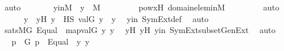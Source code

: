 \begin{isabellebody}
\ auto\isanewline
\ \ \ \ \isamarkupfalse%
\ \isamarkupfalse%
\ y{\isacharprime}{\kern0pt}inM\ {\isacharcolon}{\kern0pt}\ {\isachardoublequoteopen}y{\isacharprime}{\kern0pt}\ {\isasymin}\ M{\isachardoublequoteclose}\ \isanewline
\ \ \ \ \ \ \isamarkupfalse%
\ powx{\isacharprime}{\kern0pt}H\ domain{\isacharunderscore}{\kern0pt}elem{\isacharunderscore}{\kern0pt}in{\isacharunderscore}{\kern0pt}M\ \isanewline
\ \ \ \ \ \ \isamarkupfalse%
\ auto\isanewline
\isanewline
\ \ \ \ \isamarkupfalse%
\ y{\isacharprime}{\kern0pt}{\isacharprime}{\kern0pt}\ \ y{\isacharprime}{\kern0pt}{\isacharprime}{\kern0pt}H{\isacharcolon}{\kern0pt}\ {\isachardoublequoteopen}y{\isacharprime}{\kern0pt}{\isacharprime}{\kern0pt}\ {\isasymin}\ HS{\isachardoublequoteclose}\ {\isachardoublequoteopen}val{\isacharparenleft}{\kern0pt}G{\isacharcomma}{\kern0pt}\ y{\isacharprime}{\kern0pt}{\isacharprime}{\kern0pt}{\isacharparenright}{\kern0pt}\ {\isacharequal}{\kern0pt}\ y{\isachardoublequoteclose}\ \isamarkupfalse%
\ yin\ SymExt{\isacharunderscore}{\kern0pt}def\ \isamarkupfalse%
\ auto\isanewline
\isanewline
\ \ \ \ \isamarkupfalse%
\ {\isachardoublequoteopen}sats{\isacharparenleft}{\kern0pt}M{\isacharbrackleft}{\kern0pt}G{\isacharbrackright}{\kern0pt}{\isacharcomma}{\kern0pt}\ Equal{\isacharparenleft}{\kern0pt}{}{\isacharcomma}{\kern0pt}\ {}{\isacharparenright}{\kern0pt}{\isacharcomma}{\kern0pt}\ map{\isacharparenleft}{\kern0pt}val{\isacharparenleft}{\kern0pt}G{\isacharparenright}{\kern0pt}{\isacharcomma}{\kern0pt}\ {\isacharbrackleft}{\kern0pt}y{\isacharprime}{\kern0pt}{\isacharcomma}{\kern0pt}\ y{\isacharprime}{\kern0pt}{\isacharprime}{\kern0pt}{\isacharbrackright}{\kern0pt}{\isacharparenright}{\kern0pt}{\isacharparenright}{\kern0pt}{\isachardoublequoteclose}\ \isamarkupfalse%
\ y{\isacharprime}{\kern0pt}H\ y{\isacharprime}{\kern0pt}{\isacharprime}{\kern0pt}H\ yin\ SymExt{\isacharunderscore}{\kern0pt}subset{\isacharunderscore}{\kern0pt}GenExt\ \isamarkupfalse%
\ auto\isanewline
\ \ \ \ \isamarkupfalse%
\ \isamarkupfalse%
\ {\isachardoublequoteopen}{\isasymexists}p\ {\isasymin}\ G{\isachardot}{\kern0pt}\ p\ {\isasymtturnstile}\ Equal{\isacharparenleft}{\kern0pt}{}{\isacharcomma}{\kern0pt}\ {}{\isacharparenright}{\kern0pt}\ {\isacharbrackleft}{\kern0pt}y{\isacharprime}{\kern0pt}{\isacharcomma}{\kern0pt}\ y{\isacharprime}{\kern0pt}{\isacharprime}{\kern0pt}{\isacharbrackright}{\kern0pt}{\isachardoublequoteclose}\ \isanewline

\end{isabellebody}
